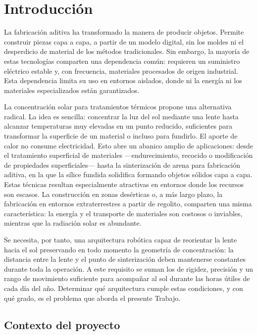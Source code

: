 \chapter{Introducción} 
\label{ch:introduccion}


La fabricación aditiva ha transformado la manera de producir objetos. Permite construir piezas capa a capa, a partir de un modelo digital, sin los moldes ni el desperdicio de material de los métodos tradicionales. Sin embargo, la mayoría de estas tecnologías comparten una dependencia común: requieren un suministro eléctrico estable y, con frecuencia, materiales procesados de origen industrial. Esta dependencia limita su uso en entornos aislados, donde ni la energía ni los materiales especializados están garantizados.

La concentración solar para tratamientos térmicos propone una alternativa radical. La idea es sencilla: concentrar la luz del sol mediante una lente hasta alcanzar temperaturas muy elevadas en un punto reducido, suficientes para transformar la superficie de un material o incluso para fundirlo. El aporte de calor no consume electricidad. Esto abre un abanico amplio de aplicaciones: desde el tratamiento superficial de materiales ---endurecimiento, recocido o modificación de propiedades superficiales--- hasta la sinterización de arena para fabricación aditiva, en la que la sílice fundida solidifica formando objetos sólidos capa a capa. Estas técnicas resultan especialmente atractivas en entornos donde los recursos son escasos. La construcción en zonas desérticas o, a más largo plazo, la fabricación en entornos extraterrestres a partir de regolito, comparten una misma característica: la energía y el transporte de materiales son costosos o inviables, mientras que la radiación solar es abundante.

Se necesita, por tanto, una arquitectura robótica capaz de reorientar la lente hacia el sol preservando en todo momento la geometría de concentración: la distancia entre la lente y el punto de sinterización deben mantenerse constantes durante toda la operación. A este requisito se suman los de rigidez, precisión y un rango de movimiento suficiente para acompañar al sol durante las horas útiles de cada día del año. Determinar qué arquitectura cumple estas condiciones, y con qué grado, es el problema que aborda el presente Trabajo.

\section{Contexto del proyecto}
\label{sec:contexto}

